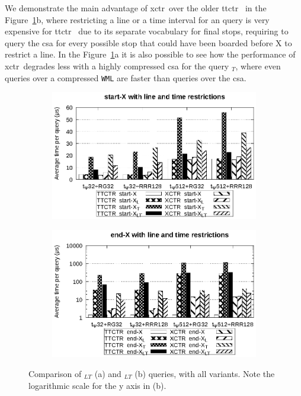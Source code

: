     We demonstrate the main advantage of \gls{xctr}~over the older \gls{ttctr}~ in the Figure~\ref{fig:start}b, where restricting a line or a time interval for an \texttt{\endX} query is very expensive for \gls{ttctr}~ due to its separate vocabulary for final stops, requiring to query the \gls{csa} for every possible stop that could have been boarded before X to restrict a line. In the Figure~\ref{fig:start}a it is also possible to see how the performance of \gls{xctr}~degrades less with a highly compressed \gls{csa} for the query \texttt{\startX$_T$}, where even queries over a compressed \texttt{WML} are faster than queries over the \gls{csa}.
    
    
    \begin{figure}[ht]
    \begin{subfigure}{0.5\linewidth}
    \includegraphics[width=\linewidth]{experiments/start.eps}
    \vspace{-12pt}
    \caption{}
    \vspace{-12pt}
    \end{subfigure}%
    \begin{subfigure}{0.5\linewidth}
    \includegraphics[width=\linewidth]{experiments/end.eps}
    \vspace{-12pt}
    \caption{}
    \vspace{-12pt}
    \end{subfigure}
    \caption{Comparison of \texttt{\startX$_{LT}$} (a) and \texttt{\endX$_{LT}$} (b) queries, with all variants. Note the logarithmic scale for the y axis in (b).}
    \label{fig:start}
    \end{figure}
    

